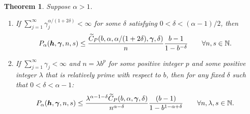 \documentclass[authoryear]{elsarticle}
\newtheorem{theorem}{Theorem}
\begin{document}
\begin{theorem} \label{thm:two}
Suppose $\alpha > 1$.
\begin{enumerate}\renewcommand{\labelenumi}{\alph{enumi}.}
    \item If $\sum_{j = 1}^{\infty} \gamma_j ^{\alpha/(1+2\delta)} < \infty$ for some $\delta$ satisfying $0 < \delta < (\alpha -1)/2$, then
\begin{equation} \label{eq:thmtwoa}
     P_\alpha(\boldsymbol{h},\boldsymbol{\gamma},n, s)
        \leq \frac{\widetilde{C}_P(b,\alpha, \alpha/(1 + 2\delta), \boldsymbol{\gamma}, \delta)}{n} \frac{b - 1 }{1 - b^{-\delta}} \qquad
        \forall n, s \in \mathbb{N}.
\end{equation}

\item If $\sum_{j = 1}^{\infty} \gamma_j < \infty$ and $n = \lambda b^p$ for some positive integer $p$ and some positive integer $\lambda$ that is relatively prime with respect to $b$, then for any fixed $\delta $ such that $0 < \delta < \alpha - 1$:
\begin{equation*}
     P_\alpha(\boldsymbol{h},\boldsymbol{\gamma},n,s)
        \leq \frac{\lambda^{\alpha - 1 - \delta }\widetilde{C}_P(b,\alpha, \boldsymbol{\gamma}, \delta)}{n^{\alpha - \delta}}\frac{(b-1)}{1 - b^{1 - \alpha + \delta}} \qquad 
        \forall  n, \lambda, s \in \mathbb{N}.
\end{equation*}
\end{enumerate}

\end{theorem}
\end{document}
